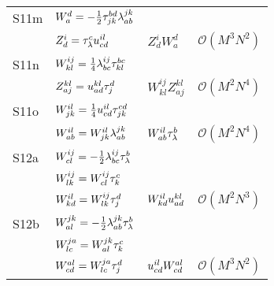 \begin{center}
\begin{longtable}{@{}llll@{}}
                S11m
                & $W^{d}_{a} = -\frac{1}{2} \tau^{bd}_{jk} \lambda^{jk}_{ab}$
                \\
                & $Z^{i}_{d} = \tau^{c}_{\lambda} u^{il}_{cd}$
                & $Z^{i}_{d} W^{d}_{a}$
                & $\mathcal{O}(M^3 N^2)$
                \\

                S11n
                & $W^{ij}_{kl} = \frac{1}{4} \lambda^{ij}_{bc} \tau^{bc}_{kl}$
                \\
                & $Z^{kl}_{aj} = u^{kl}_{ad} \tau^{d}_{j}$
                & $W^{ij}_{kl} Z^{kl}_{aj}$
                & $\mathcal{O}(M^2 N^4)$
                \\

                S11o
                & $W^{il}_{jk} = \frac{1}{4} u^{il}_{cd} \tau^{cd}_{jk}$
                \\
                & $W^{il}_{ab} = W^{il}_{jk} \lambda^{jk}_{ab}$
                & $W^{il}_{ab} \tau^{b}_{\lambda}$
                & $\mathcal{O}(M^2 N^4)$
                \\

                S12a
                & $W^{ij}_{cl} = -\frac{1}{2} \lambda^{ij}_{bc} \tau^{b}_{\lambda}$
                \\
                & $W^{ij}_{lk} = W^{ij}_{cl} \tau^{c}_{k}$
                \\
                & $W^{il}_{kd} = W^{ij}_{lk} \tau^{d}_{j}$
                & $W^{il}_{kd} u^{kl}_{ad}$
                & $\mathcal{O}(M^2 N^3)$
                \\

                S12b
                & $W^{jk}_{al} = -\frac{1}{2} \lambda^{jk}_{ab} \tau^{b}_{\lambda}$
                \\
                & $W^{ja}_{lc} = W^{jk}_{al} \tau^{c}_{k}$
                \\
                & $W^{al}_{cd} = W^{ja}_{lc} \tau^{d}_{j}$
                & $u^{il}_{cd} W^{al}_{cd}$
                & $\mathcal{O}(M^3 N^2)$
                \\
            \end{longtable}
        \end{center}

